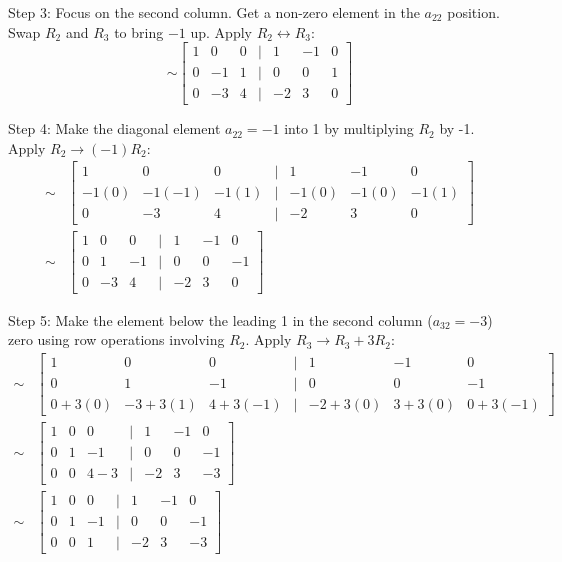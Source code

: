 \documentclass{article}
\begin{document}
Step 3: Focus on the second column. Get a non-zero element in the $a_{22}$ position. Swap $R_2$ and $R_3$ to bring $-1$ up.
Apply $R_2 \leftrightarrow R_3$:
\[ \sim \begin{bmatrix} 1 & 0 & 0 & | & 1 & -1 & 0 \\ 0 & -1 & 1 & | & 0 & 0 & 1 \\ 0 & -3 & 4 & | & -2 & 3 & 0 \end{bmatrix} \]

Step 4: Make the diagonal element $a_{22}=-1$ into 1 by multiplying $R_2$ by -1.
Apply $R_2 \to (-1)R_2$:
\begin{align*} \sim &\begin{bmatrix} 1 & 0 & 0 & | & 1 & -1 & 0 \\ -1(0) & -1(-1) & -1(1) & | & -1(0) & -1(0) & -1(1) \\ 0 & -3 & 4 & | & -2 & 3 & 0 \end{bmatrix} \\ \sim &\begin{bmatrix} 1 & 0 & 0 & | & 1 & -1 & 0 \\ 0 & 1 & -1 & | & 0 & 0 & -1 \\ 0 & -3 & 4 & | & -2 & 3 & 0 \end{bmatrix}\end{align*}

Step 5: Make the element below the leading 1 in the second column ($a_{32}=-3$) zero using row operations involving $R_2$.
Apply $R_3 \to R_3 + 3R_2$:
\begin{align*} \sim &\begin{bmatrix} 1 & 0 & 0 & | & 1 & -1 & 0 \\ 0 & 1 & -1 & | & 0 & 0 & -1 \\ 0 + 3(0) & -3 + 3(1) & 4 + 3(-1) & | & -2 + 3(0) & 3 + 3(0) & 0 + 3(-1) \end{bmatrix} \\ \sim &\begin{bmatrix} 1 & 0 & 0 & | & 1 & -1 & 0 \\ 0 & 1 & -1 & | & 0 & 0 & -1 \\ 0 & 0 & 4 - 3 & | & -2 & 3 & -3 \end{bmatrix} \\ \sim &\begin{bmatrix} 1 & 0 & 0 & | & 1 & -1 & 0 \\ 0 & 1 & -1 & | & 0 & 0 & -1 \\ 0 & 0 & 1 & | & -2 & 3 & -3 \end{bmatrix}\end{align*}
\end{document}
